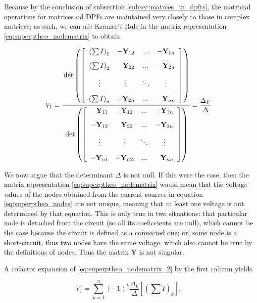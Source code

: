 	Because by the conclusion of subsection \ref{subsec:matrces_in_dpfts}, the matricial operations for matrices od DPFs are maintained very closely to those in complex matrices; as such, we can use Kramer's Rule in the matrix representation \eqref{eq:superptheo_nodematrix} to obtain

\begin{equation} V_1 = \dfrac{\raisebox{-14mm}{} 
\det\left(\left[\begin{array}{cccc} \left(\sum I\right)_1 & - \mathbf{Y}_{12} & ... & -\mathbf{Y}_{1n} \\[3mm] \left(\sum I\right)_2 & \phantom{-}\mathbf{Y}_{22} &...& -\mathbf{Y}_{2n} \\[3mm] \vdots & \vdots & \ddots & \vdots \\[3mm] \left(\sum I\right)_n & -\mathbf{Y}_{2n} & ... & \phantom{-}\mathbf{Y}_{nn}\end{array}\right]\right)
}{\raisebox{12mm}{}
\det\left(\left[ \begin{array}{cccc} \phantom{-}\mathbf{Y}_{11} & - \mathbf{Y}_{12} & ... & -\mathbf{Y}_{1n} \\[3mm] -\mathbf{Y}_{12} & \phantom{-}\mathbf{Y}_{22} &...& -\mathbf{Y}_{2n} \\[3mm] \vdots & \vdots & \ddots & \vdots \\[3mm] - \mathbf{Y}_{n1} & -\mathbf{Y}_{n2} & ... & \phantom{-}\mathbf{Y}_{nn}\end{array}\right]\right)
} =
%
\dfrac{\Delta_V}{\Delta}
\label{eq:superptheo_nodematrix_2}
\end{equation}

	We now argue that the determinant $\Delta$ is not null. If this were the case, then the matrix representation \eqref{eq:superptheo_nodematrix} would mean that the voltage values of the nodes obtained from the current sources in equation \eqref{eq:superptheo_nodes} are not unique, meaning that at least one voltage is not determined by that equation. This is only true in two situations: that particular node is detached from the circuit (so all its coeficcients are null), which cannot be the case because the circuit is defined as a connected one; or, some node is a short-circuit, thus two nodes have the same voltage, which also cannot be true by the definitions of nodes. Thus the matrix $\mathbf{Y}$ is not singular.

	A cofactor expansion of \eqref{eq:superptheo_nodematrix_2} by the first column yields

\begin{equation} V_1 = \sum_{k=1}^n \left(-1\right)^k \dfrac{\Delta_{k}}{\Delta}\left [\left(\sum I\right)_k\right], \end{equation} 


